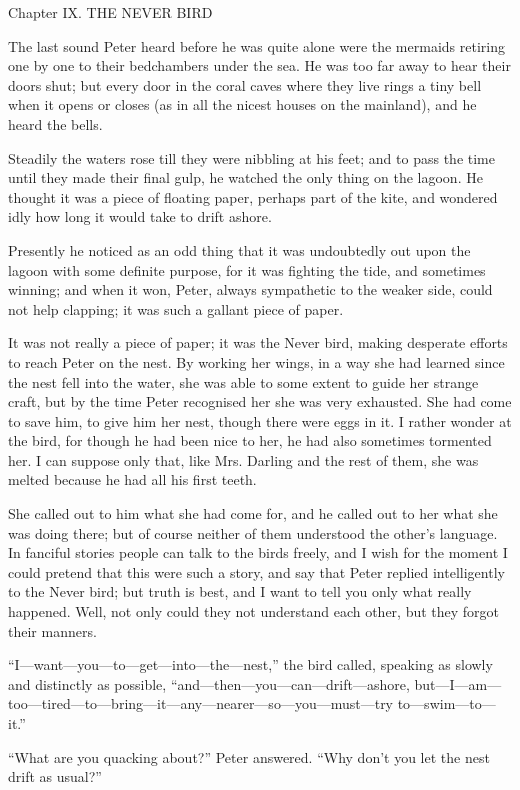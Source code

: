 Chapter IX.
THE NEVER BIRD


The last sound Peter heard before he was quite alone were the mermaids
retiring one by one to their bedchambers under the sea. He was too far
away to hear their doors shut; but every door in the coral caves where
they live rings a tiny bell when it opens or closes (as in all the
nicest houses on the mainland), and he heard the bells.

Steadily the waters rose till they were nibbling at his feet; and to
pass the time until they made their final gulp, he watched the only
thing on the lagoon. He thought it was a piece of floating paper,
perhaps part of the kite, and wondered idly how long it would take to
drift ashore.

Presently he noticed as an odd thing that it was undoubtedly out upon
the lagoon with some definite purpose, for it was fighting the tide,
and sometimes winning; and when it won, Peter, always sympathetic to
the weaker side, could not help clapping; it was such a gallant piece
of paper.

It was not really a piece of paper; it was the Never bird, making
desperate efforts to reach Peter on the nest. By working her wings, in
a way she had learned since the nest fell into the water, she was able
to some extent to guide her strange craft, but by the time Peter
recognised her she was very exhausted. She had come to save him, to
give him her nest, though there were eggs in it. I rather wonder at the
bird, for though he had been nice to her, he had also sometimes
tormented her. I can suppose only that, like Mrs. Darling and the rest
of them, she was melted because he had all his first teeth.

She called out to him what she had come for, and he called out to her
what she was doing there; but of course neither of them understood the
other's language. In fanciful stories people can talk to the birds
freely, and I wish for the moment I could pretend that this were such a
story, and say that Peter replied intelligently to the Never bird; but
truth is best, and I want to tell you only what really happened. Well,
not only could they not understand each other, but they forgot their
manners.

``I—want—you—to—get—into—the—nest,'' the bird called, speaking as slowly
and distinctly as possible, ``and—then—you—can—drift—ashore,
but—I—am—too—tired—to—bring—it—any—nearer—so—you—must—try
to—swim—to—it.''

``What are you quacking about?'' Peter answered. ``Why don't you let the
nest drift as usual?''

